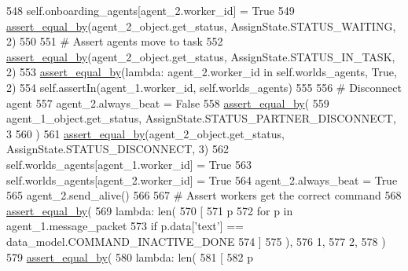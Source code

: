 \begin{DoxyCode}
548         self.onboarding\_agents[agent\_2.worker\_id] = \textcolor{keyword}{True}
549         \hyperlink{namespaceparlai_1_1mturk_1_1core_1_1test_1_1test__full__system_a0b463246d35658a2e422010f13dcf819}{assert\_equal\_by}(agent\_2\_object.get\_status, AssignState.STATUS\_WAITING, 2)
550 
551         \textcolor{comment}{# Assert agents move to task}
552         \hyperlink{namespaceparlai_1_1mturk_1_1core_1_1test_1_1test__full__system_a0b463246d35658a2e422010f13dcf819}{assert\_equal\_by}(agent\_2\_object.get\_status, AssignState.STATUS\_IN\_TASK, 2)
553         \hyperlink{namespaceparlai_1_1mturk_1_1core_1_1test_1_1test__full__system_a0b463246d35658a2e422010f13dcf819}{assert\_equal\_by}(\textcolor{keyword}{lambda}: agent\_2.worker\_id \textcolor{keywordflow}{in} self.worlds\_agents, \textcolor{keyword}{True}, 2)
554         self.assertIn(agent\_1.worker\_id, self.worlds\_agents)
555 
556         \textcolor{comment}{# Disconnect agent}
557         agent\_2.always\_beat = \textcolor{keyword}{False}
558         \hyperlink{namespaceparlai_1_1mturk_1_1core_1_1test_1_1test__full__system_a0b463246d35658a2e422010f13dcf819}{assert\_equal\_by}(
559             agent\_1\_object.get\_status, AssignState.STATUS\_PARTNER\_DISCONNECT, 3
560         )
561         \hyperlink{namespaceparlai_1_1mturk_1_1core_1_1test_1_1test__full__system_a0b463246d35658a2e422010f13dcf819}{assert\_equal\_by}(agent\_2\_object.get\_status, AssignState.STATUS\_DISCONNECT, 3)
562         self.worlds\_agents[agent\_1.worker\_id] = \textcolor{keyword}{True}
563         self.worlds\_agents[agent\_2.worker\_id] = \textcolor{keyword}{True}
564         agent\_2.always\_beat = \textcolor{keyword}{True}
565         agent\_2.send\_alive()
566 
567         \textcolor{comment}{# Assert workers get the correct command}
568         \hyperlink{namespaceparlai_1_1mturk_1_1core_1_1test_1_1test__full__system_a0b463246d35658a2e422010f13dcf819}{assert\_equal\_by}(
569             \textcolor{keyword}{lambda}: len(
570                 [
571                     p
572                     \textcolor{keywordflow}{for} p \textcolor{keywordflow}{in} agent\_1.message\_packet
573                     \textcolor{keywordflow}{if} p.data[\textcolor{stringliteral}{'text'}] == data\_model.COMMAND\_INACTIVE\_DONE
574                 ]
575             ),
576             1,
577             2,
578         )
579         \hyperlink{namespaceparlai_1_1mturk_1_1core_1_1test_1_1test__full__system_a0b463246d35658a2e422010f13dcf819}{assert\_equal\_by}(
580             \textcolor{keyword}{lambda}: len(
581                 [
582                     p

\end{DoxyCode}
